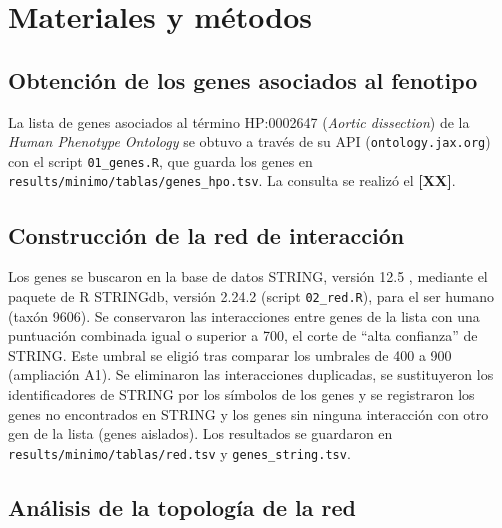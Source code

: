 \section{Materiales y métodos}


\subsection{Obtención de los genes asociados al fenotipo}

La lista de genes asociados al término HP:0002647 (\textit{Aortic dissection}) de la \textit{Human Phenotype Ontology} \cite{Gargano2024} se obtuvo a través de su API (\texttt{ontology.jax.org}) con el script \texttt{01\_genes.R}, que guarda los genes en \texttt{results/minimo/tablas/genes\_hpo.tsv}. La consulta se realizó el \textbf{[XX]}.

\subsection{Construcción de la red de interacción}

Los genes se buscaron en la base de datos STRING, versión 12.5 \cite{Szklarczyk2025}, mediante el paquete de R STRINGdb, versión 2.24.2 \cite{Szklarczyk2025} (script \texttt{02\_red.R}), para el ser humano (taxón 9606). Se conservaron las interacciones entre genes de la lista con una puntuación combinada igual o superior a 700, el corte de ``alta confianza'' de STRING. Este umbral se eligió tras comparar los umbrales de 400 a 900 (ampliación A1). Se eliminaron las interacciones duplicadas, se sustituyeron los identificadores de STRING por los símbolos de los genes y se registraron los genes no encontrados en STRING y los genes sin ninguna interacción con otro gen de la lista (genes aislados). Los resultados se guardaron en \texttt{results/minimo/tablas/red.tsv} y \texttt{genes\_string.tsv}.

\subsection{Análisis de la topología de la red}

